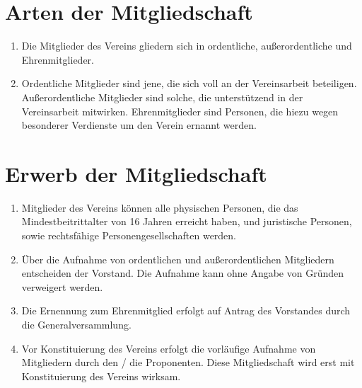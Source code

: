 \documentclass[a4paper,12pt]{article}
\newcommand{\comment}[1]{{\bf /*Komm.:} \textit{#1} {\bf */}}
\def\comment#1{}
\begin{document}
\section{Arten der Mitgliedschaft} %
\label{sec:Mitgliedschaft-Arten}
\begin{enumerate}
\item Die Mitglieder des Vereins gliedern sich in ordentliche, außerordentliche und Ehrenmitglieder.

\item Ordentliche Mitglieder sind jene, die sich voll an der Vereinsarbeit beteiligen.
Außerordentliche Mitglieder sind solche, die unterstützend in der Vereinsarbeit mitwirken. Ehrenmitglieder sind Personen, die hiezu wegen besonderer Verdienste um den Verein ernannt werden.

\comment{\item VarB: Ordentliche Mitglieder sind jene, die sich voll an der Vereinsarbeit beteiligen.
Außerordentliche Mitglieder sind solche, die die Vereinstätigkeit vor allem durch Zahlung eines erhöhten Mitgliedsbeitrags fördern.
\comment{Marco: Zu spezifisch imo}
\comment{War vorher:Außerordentliche Mitglieder sind solche, die unterstützend in der Vereinsarbeit mitwirken.}
Ehrenmitglieder sind Personen, die hierzu wegen besonderer Verdienste um den Verein ernannt werden.}
\end{enumerate}

\section{Erwerb der Mitgliedschaft} %
\begin{enumerate}
\item Mitglieder des Vereins können alle physischen Personen, die das Mindestbeitrittalter von 16 Jahren erreicht haben, und juristische Personen, sowie rechtsfähige Personengesellschaften werden.
\item Über die Aufnahme von ordentlichen und au{\ss}erordentlichen Mitgliedern entscheiden der Vorstand. Die Aufnahme kann ohne Angabe von Gründen verweigert werden.
\item Die Ernennung zum Ehrenmitglied erfolgt auf Antrag des Vorstandes durch die Generalversammlung.
\item Vor Konstituierung des Vereins erfolgt die vorläufige Aufnahme von Mitgliedern durch den / die Proponenten. Diese Mitgliedschaft wird erst mit Konstituierung des Vereins wirksam.
\end{enumerate}
\end{document}
